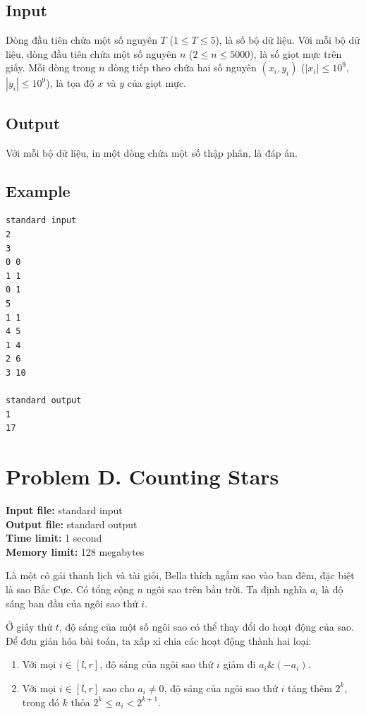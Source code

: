 \documentclass[11pt]{article}
\begin{document}
\subsection*{Input}

Dòng đầu tiên chứa một số nguyên $T$ ($1\le T\le 5$), là số bộ dữ liệu. Với
mỗi bộ dữ liệu, dòng đầu tiên chứa một số nguyên $n$ ($2\le n\le 5000$), là
số giọt mực trên giấy. Mỗi dòng trong $n$ dòng tiếp theo chứa hai số nguyên
$(x_i,y_i)$ ($|x_i|\le 10^9$, $|y_i|\le 10^9$), là tọa độ $x$ và $y$ của
giọt mực.

\subsection*{Output}

Với mỗi bộ dữ liệu, in một dòng chứa một số thập phân, là đáp án.

\subsection*{Example}

\begin{verbatim}
standard input
2
3
0 0
1 1
0 1
5
1 1
4 5
1 4
2 6
3 10

standard output
1
17
\end{verbatim}

\section{Problem D. Counting Stars}

\noindent
\textbf{Input file:} standard input\\
\textbf{Output file:} standard output\\
\textbf{Time limit:} 1 second\\
\textbf{Memory limit:} 128 megabytes

Là một cô gái thanh lịch và tài giỏi, Bella thích ngắm sao vào ban đêm, đặc
biệt là sao Bắc Cực. Có tổng cộng $n$ ngôi sao trên bầu trời. Ta định nghĩa
$a_i$ là độ sáng ban đầu của ngôi sao thứ $i$.

Ở giây thứ $t$, độ sáng của một số ngôi sao có thể thay đổi do hoạt động của
sao. Để đơn giản hóa bài toán, ta xấp xỉ chia các hoạt động thành hai loại:
\begin{enumerate}
  \item Với mọi $i\in [l,r]$, độ sáng của ngôi sao thứ $i$ giảm đi
  $a_i\&(-a_i)$.
  \item Với mọi $i\in [l,r]$ sao cho $a_i\ne 0$, độ sáng của ngôi sao thứ $i$
  tăng thêm $2^k$, trong đó $k$ thỏa $2^k\le a_i<2^{k+1}$.
\end{enumerate}
\end{document}
